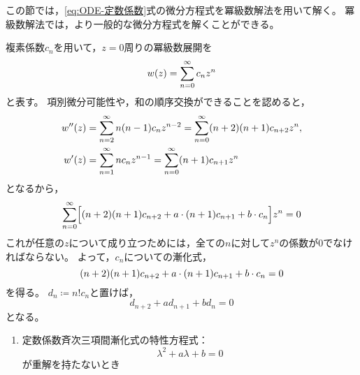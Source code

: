 \documentclass[a4paper,draft]{ltjsarticle}
\begin{document}
この節では，\eqref{eq:ODE-定数係数}式の微分方程式を冪級数解法を用いて解く。
冪級数解法では，より一般的な微分方程式を解くことができる。

複素係数$c_n$を用いて，$z=0$周りの冪級数展開を
\begin{equation}
    w\pare{z}=\sum_{n=0}^\infty c_n z^n
\end{equation}
と表す。
項別微分可能性や，和の順序交換ができることを認めると，
\begin{align}
    w''\pare{z} & =\sum_{n=2}^\infty n\pare{n-1}c_nz^{n-2}=\sum_{n=0}^\infty \pare{n+2}\pare{n+1}c_{n+2}z^n,
    \\
    w'\pare{z}  & =\sum_{n=1}^\infty nc_n z^{n-1}=\sum_{n=0}^\infty \pare{n+1}c_{n+1}z^n
\end{align}
となるから，
\begin{equation}
    \sum_{n=0}^\infty\bsqu{\pare{n+2}\pare{n+1}c_{n+2}+a\cdot\pare{n+1}c_{n+1}+b\cdot c_n}z^n=0
\end{equation}
これが任意の$z$について成り立つためには，全ての$n$に対して$z^n$の係数が0でなければならない。
よって，$c_n$についての漸化式，
\begin{equation}
    \pare{n+2}\pare{n+1}c_{n+2}+a\cdot\pare{n+1}c_{n+1}+b\cdot c_n=0
\end{equation}
を得る。
$d_n\coloneqq n!c_n$と置けば，
\begin{equation}
    d_{n+2}+ad_{n+1}+bd_n=0
\end{equation}
となる。

\begin{enumerate}[label=(\roman*)]
    \item 定数係数斉次三項間漸化式の特性方程式：
    \begin{equation}
        \lambda^2+a\lambda+b=0
    \end{equation}
    が重解を持たないとき
\end{enumerate}
\end{document}

